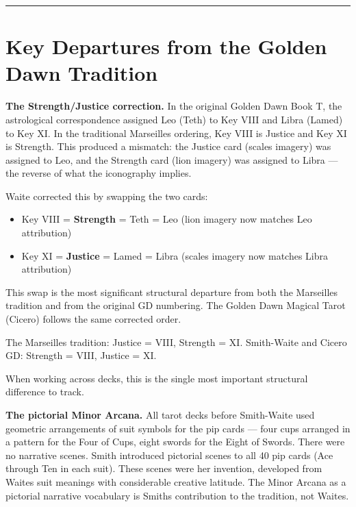 \begin{center}\rule{0.5\linewidth}{0.5pt}\end{center}

\section{Key Departures from the Golden Dawn Tradition}\label{key-departures-from-the-golden-dawn-tradition}

\textbf{The Strength/Justice correction.} In the original Golden Dawn Book T, the astrological correspondence assigned Leo (Teth) to Key VIII and Libra (Lamed) to Key XI. In the traditional Marseilles ordering, Key VIII is Justice and Key XI is Strength. This produced a mismatch: the Justice card (scales imagery) was assigned to Leo, and the Strength card (lion imagery) was assigned to Libra --- the reverse of what the iconography implies.

Waite corrected this by swapping the two cards:

\begin{itemize}
\tightlist
\item
  Key VIII = \textbf{Strength} = Teth = Leo (lion imagery now matches Leo attribution)
\item
  Key XI = \textbf{Justice} = Lamed = Libra (scales imagery now matches Libra attribution)
\end{itemize}

This swap is the most significant structural departure from both the Marseilles tradition and from the original GD numbering. The Golden Dawn Magical Tarot (Cicero) follows the same corrected order.

The Marseilles tradition: Justice = VIII, Strength = XI. Smith-Waite and Cicero GD: Strength = VIII, Justice = XI.

When working across decks, this is the single most important structural difference to track.

\textbf{The pictorial Minor Arcana.} All tarot decks before Smith-Waite used geometric arrangements of suit symbols for the pip cards --- four cups arranged in a pattern for the Four of Cups, eight swords for the Eight of Swords. There were no narrative scenes. Smith introduced pictorial scenes to all 40 pip cards (Ace through Ten in each suit). These scenes were her invention, developed from Waite\textquotesingle s suit meanings with considerable creative latitude. The Minor Arcana as a pictorial narrative vocabulary is Smith\textquotesingle s contribution to the tradition, not Waite\textquotesingle s.

